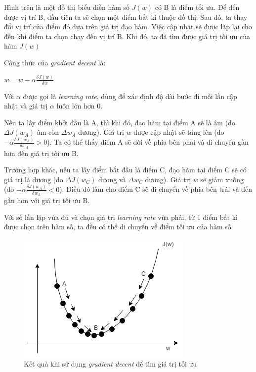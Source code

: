 Hình trên là một đồ thị biểu diễn hàm số $J(w)$ có B là điểm tối ưu. Để đến được vị trí B, đầu tiên ta sẽ chọn một điểm bất kì thuộc đồ thị. Sau đó, ta thay đổi vị trí của điểm đó dựa trên giá trị đạo hàm. Việc cập nhật sẽ được lặp lại cho đến khi điểm ta chọn chạy đến vị trí B. Khi đó, ta đã tìm được giá trị tối ưu của hàm $J(w)$

Công thức của \textit{gradient decent} là:
\begin{center}
$w = w - \alpha\frac{\delta J(w)}{\delta w}$
\end{center}

Với $\alpha$ được gọi là \textit{learning rate}, dùng để xác định độ dài bước đi mỗi lần cập nhật và giá trị $\alpha$ luôn lớn hơn $0$.

Nếu ta lấy điểm khởi đầu là A, thì khi đó, đạo hàm tại điểm A sẽ là âm (do $\Delta J(w_{A})$ âm còn $\Delta w_{A}$ dương). Giá trị $w$ được cập nhật sẽ tăng lên (do $-\alpha\frac{\delta J(w_{A})}{\delta w_{A}} > 0$). Ta có thể thấy điểm A sẽ dời về phía bên phải và di chuyển gần hơn đến giá trị tối ưu B.

Trường hợp khác, nếu ta lấy điểm bắt đầu là điểm C, đạo hàm tại điểm C sẽ có giá trị là dương (do $\Delta J(w_{C})$ dương và $\Delta w_{C}$ dương). Giá trị $w$ sẽ giảm xuống (do $-\alpha\frac{\delta J(w_{A})}{\delta w_{A}} < 0$). Điều đó làm cho điểm C sẽ di chuyển về phía bên trái và đến gần hơn với giá trị tối ưu B.

Với số lần lặp vừa đủ và chọn giá trị \textit{learning rate} vừa phải, từ 1 điểm bất kì được chọn trên hàm số, ta đều có thể di chuyển về điểm tối ưu của hàm số.

\begin{figure}[!h]
\centerline{\includegraphics{books/artificial-neural-network/chapter02/figure/grad_2.png}}
\caption{Kết quả khi sử dụng \textit{gradient decent} để tìm giá trị tối ưu}
\label{fig:grad_2}
\end{figure}

